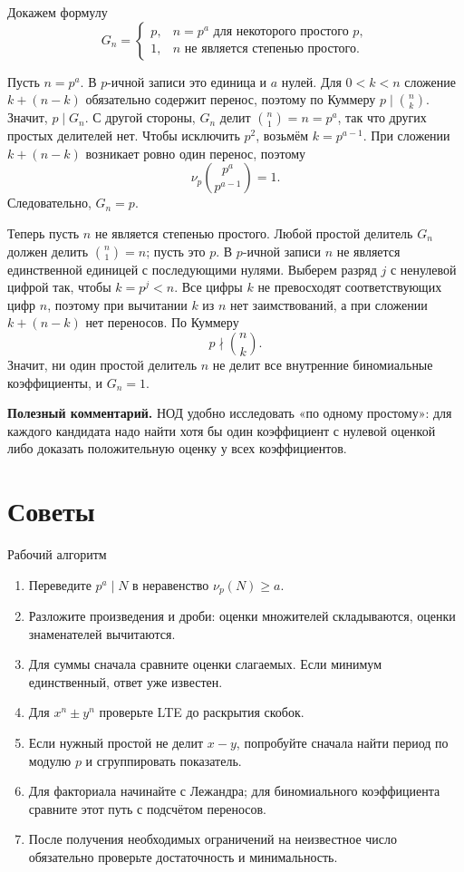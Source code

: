 \begin{solutionbox}
Докажем формулу
\[
  \boxed{
  G_n=
  \begin{cases}
    p,& n=p^a\text{ для некоторого простого }p,\\
    1,& n\text{ не является степенью простого}.
  \end{cases}}
\]

Пусть $n=p^a$. В $p$-ичной записи это единица и $a$ нулей. Для
$0<k<n$ сложение $k+(n-k)$ обязательно содержит перенос, поэтому по
Куммеру $p\mid\binom nk$. Значит, $p\mid G_n$. С другой стороны,
$G_n$ делит $\binom n1=n=p^a$, так что других простых делителей нет.
Чтобы исключить $p^2$, возьмём $k=p^{a-1}$. При сложении
$k+(n-k)$ возникает ровно один перенос, поэтому
\[
  \nu_p\binom{p^a}{p^{a-1}}=1.
\]
Следовательно, $G_n=p$.

Теперь пусть $n$ не является степенью простого. Любой простой делитель
$G_n$ должен делить $\binom n1=n$; пусть это $p$. В $p$-ичной записи
$n$ не является единственной единицей с последующими нулями. Выберем
разряд $j$ с ненулевой цифрой так, чтобы $k=p^j<n$. Все цифры $k$ не
превосходят соответствующих цифр $n$, поэтому при вычитании $k$ из
$n$ нет заимствований, а при сложении $k+(n-k)$ нет переносов.
По Куммеру
\[
  p\nmid\binom nk.
\]
Значит, ни один простой делитель $n$ не делит все внутренние
биномиальные коэффициенты, и $G_n=1$.

\textbf{Полезный комментарий.}
НОД удобно исследовать «по одному простому»: для каждого кандидата
надо найти хотя бы один коэффициент с нулевой оценкой либо доказать
положительную оценку у всех коэффициентов.
\end{solutionbox}

\section{Советы}

\begin{methodbox}{Рабочий алгоритм}
\begin{enumerate}
  \item Переведите $p^a\mid N$ в неравенство $\nu_p(N)\ge a$.
  \item Разложите произведения и дроби: оценки множителей складываются,
        оценки знаменателей вычитаются.
  \item Для суммы сначала сравните оценки слагаемых. Если минимум
        единственный, ответ уже известен.
  \item Для $x^n\pm y^n$ проверьте LTE до раскрытия скобок.
  \item Если нужный простой не делит $x-y$, попробуйте сначала найти
        период по модулю $p$ и сгруппировать показатель.
  \item Для факториала начинайте с Лежандра; для биномиального
        коэффициента сравните этот путь с подсчётом переносов.
  \item После получения необходимых ограничений на неизвестное число
        обязательно проверьте достаточность и минимальность.
\end{enumerate}
\end{methodbox}

